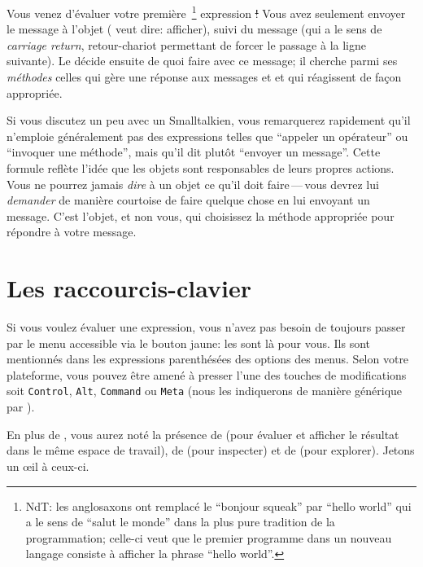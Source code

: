 \documentclass[a4paper,10pt,twoside]{book}
\begin{document}
Vous venez d'\'evaluer votre premi\`ere~\footnote{NdT: les anglosaxons
ont remplac\'e le ``bonjour squeak'' par ``hello world'' qui a le
sens de ``salut le monde'' dans la plus pure tradition de la
programmation; celle-ci veut que le premier programme
dans un nouveau langage consiste \`a afficher la phrase ``hello
world''.}
expression \st!
Vous avez seulement envoyer le message  \`a
l'objet  ( veut dire: afficher), suivi du
message  
(qui a le sens de \emph{carriage return}, \cad retour-chariot
permettant de forcer le passage \`a la ligne suivante).
Le  d\'ecide ensuite de quoi faire avec ce message; il
cherche parmi ses \emph{m\'ethodes} celles qui g\`ere une r\'eponse
aux messages  et  et qui r\'eagissent de fa\c{c}on
appropri\'ee.

Si vous discutez un peu avec un Smalltalkien, vous remarquerez
rapidement qu'il n'emploie g\'en\'eralement pas des expressions
telles que ``appeler un op\'erateur'' ou ``invoquer une m\'ethode'',
mais qu'il dit plut\^ot ``envoyer un message''.
Cette formule refl\`ete l'id\'ee que les objets sont responsables de
leurs propres actions. Vous ne pourrez jamais \emph{dire} \`a un objet
ce qu'il doit faire\,---\,vous devrez lui \emph{demander} de mani\`ere
courtoise de faire quelque chose en lui envoyant un message.
C'est l'objet, et non vous, qui choisissez la m\'ethode appropri\'ee
pour r\'epondre \`a votre message.

\section{Les raccourcis-clavier}

Si vous voulez \'evaluer une expression, vous n'avez pas besoin de
toujours passer par le menu accessible via le bouton jaune: les
 sont l\`a pour vous. Ils sont mentionn\'es
dans les expressions parenth\'es\'ees des options des menus. Selon
votre plateforme, vous pouvez \^etre amen\'e \`a presser l'une des
touches de modifications soit \texttt{Control}, \texttt{Alt},
\texttt{Command} ou \texttt{Meta} (nous les indiquerons de mani\`ere
g\'en\'erique par ).


En plus de , vous aurez not\'e la pr\'esence de
(pour \'evaluer et afficher le r\'esultat dans le m\^eme espace de travail), 
de  (pour inspecter) et de  (pour
explorer). 
Jetons un \oe il \`a ceux-ci.
\end{document}
